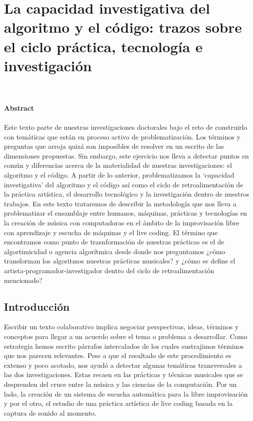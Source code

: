 \chapter{La capacidad investigativa del algoritmo y el código: trazos sobre el ciclo práctica, tecnología e investigación}

\author{Aaron Escobar Castañeda y Hernani Villaseñor Ramírez}
\\
\\
\textbf{Abstract}
\\
\\
Este texto parte de nuestras investigaciones doctorales bajo el reto de construirlo con temáticas que están en proceso activo de problematización. Los términos y preguntas que arroja quizá son imposibles de resolver en un escrito de las dimensiones propuestas. Sin embargo, este ejercicio nos lleva a detectar puntos en común y diferencias acerca de la materialidad de nuestras investigaciones: el algoritmo y el código. A partir de lo anterior, problematizamos la ‘capacidad investigativa’ del algoritmo y el código así como el ciclo de retroalimentación de la práctica artística, el desarrollo tecnológico y la investigación dentro de nuestros trabajos. En este texto trataremos de describir la metodología que nos lleva a problematizar el ensamblaje entre humanos, máquinas, prácticas y tecnologías en la creación de música con computadoras en el ámbito de la improvisación libre con aprendizaje y escucha de máquinas y el live coding. El término que encontramos como punto de trasnformación de nuestras prácticas es el de algortimicidad o agencia algorítmica desde donde nos preguntamos ¿cómo transforman los algoritmos nuestras prácticas musicales? y ¿cómo se define el artista-programador-investigador dentro del ciclo de retroalimentación mencionado?

\section{Introducción}
Escribir un texto colaborativo implica negociar perspectivas, ideas, términos y conceptos para llegar a un acuerdo sobre el tema o problema a desarrollar. Como estrategia hemos escrito párrafos intercalados de los cuales sustrajimos términos que nos parecen relevantes. Pese a que el resultado de este procedimiento es extenso y poco acotado, nos ayudó a detectar algunas temáticas transversales a las dos investigaciones. Estas recaen en las prácticas y técnicas musicales que se desprenden del cruce entre la música y las ciencias de la computación. Por un lado, la creación de un sistema de escucha automática para la libre improvisación y por el otro, el estudio de una práctica artística de live coding basada en la captura de sonido al momento.

